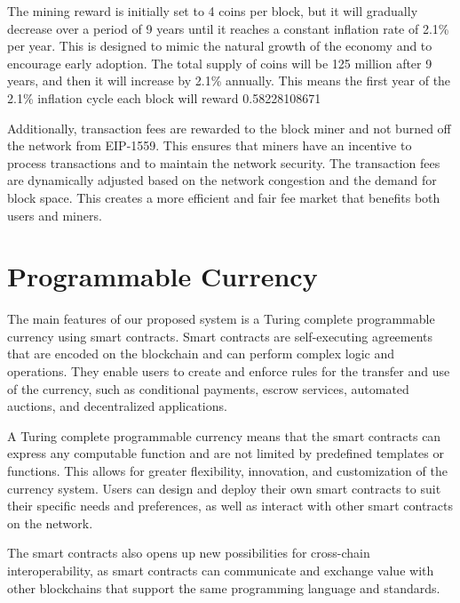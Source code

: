 \documentclass[a4paper,onecolumn, superscriptaddress,10pt,accepted=2020-05-01,issue=1, volume=2, shorttitle=papers]{compositionalityarticle}
\begin{document}
\vspace{0.3cm}

The mining reward is initially set to 4 coins per block, but it will gradually decrease over a period of 9 years until it reaches a constant inflation rate of 2.1\% per year. This is designed to mimic the natural growth of the economy and to encourage early adoption. The total supply of coins will be 125 million after 9 years, and then it will increase by 2.1\% annually. This means the first year of the 2.1\% inflation cycle each block will reward 0.58228108671

\vspace{0.3cm}

Additionally, transaction fees are rewarded to the block miner and not burned off the network from EIP-1559. This ensures that miners have an incentive to process transactions and to maintain the network security. The transaction fees are dynamically adjusted based on the network congestion and the demand for block space. This creates a more efficient and fair fee market that benefits both users and miners.

\section{Programmable Currency}

The main features of our proposed system is a Turing complete programmable currency using smart contracts. Smart contracts are self-executing agreements that are encoded on the blockchain and can perform complex logic and operations. They enable users to create and enforce rules for the transfer and use of the currency, such as conditional payments, escrow services, automated auctions, and decentralized applications. 

\vspace{0.3cm}

A Turing complete programmable currency means that the smart contracts can express any computable function and are not limited by predefined templates or functions. This allows for greater flexibility, innovation, and customization of the currency system. Users can design and deploy their own smart contracts to suit their specific needs and preferences, as well as interact with other smart contracts on the network. 

\vspace{0.3cm}

The smart contracts also opens up new possibilities for cross-chain interoperability, as smart contracts can communicate and exchange value with other blockchains that support the same programming language and standards.
\end{document}
